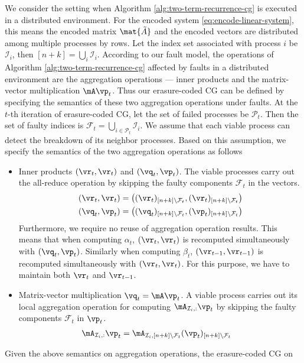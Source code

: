 \documentclass[11pt]{article}
\newcommand{\tA}{\mat{\tilde{A}}}
\newcommand{\sF}{{\mathcal{F}}}
\newcommand{\sI}{{\mathcal{I}}}
\newcommand{\sP}{{\mathcal{P}}}
\begin{document}
We consider the setting when Algorithm \ref{alg:two-term-recurrence-cg} is executed
in a distributed environment. For the encoded system \eqref{eq:encode-linear-system},
this means the encoded matrix $\tA$ and the encoded vectors are distributed among
multiple processes by rows. Let the index set associated with process $i$ be $\sI_i$,
then $[n+k]=\bigcup_{i}\sI_i$. According to our fault model, the operations of
Algorithm \ref{alg:two-term-recurrence-cg} affected by faults in a distributed
environment are the aggregation operations --- inner products and the matrix-vector
multiplication $\mA\vp_t$. Thus our erasure-coded CG can be defined by specifying
the semantics of these two aggregation operations under faults. At the $t$-th
iteration of erasure-coded CG, let the set of failed processes be $\sP_t$.
Then the set of faulty indices is $\sF_t=\bigcup_{i\in\sP_t}\sI_i$. We assume that 
each viable process can detect the breakdown of its neighbor processes. 
Based on this assumption, we specify the semantics of the two aggregation operations as follows
\begin{itemize}
\item Inner products $(\vr_t,\vr_t)$ and $(\vq_t,\vp_t)$. The viable processes carry out the all-reduce operation by skipping the faulty components $\sF_t$ in the vectors.
\begin{align}
(\vr_t,\vr_t) &= \left((\vr_t)_{[n+k]\backslash \sF_t},(\vr_t)_{[n+k]\backslash \sF_t}\right)
\label{eq:inner-product-fault-tolerant}
\\
(\vq_t,\vp_t) &= \left((\vq_t)_{[n+k]\backslash \sF_t},(\vp_t)_{[n+k]\backslash \sF_t}\right)
\nonumber
\end{align}
Furthermore, we require no reuse of aggregation operation results. This means that
when computing $\alpha_t$, $(\vr_t,\vr_t)$ is recomputed simultaneously
with $(\vq_t,\vp_t)$. Similarly when computing $\beta_t$, $(\vr_{t-1}, \vr_{t-1})$
is recomputed simultaneously with $(\vr_t,\vr_t)$. For this purpose, we have to
maintain both $\vr_t$ and $\vr_{t-1}$.
\item Matrix-vector multiplication $\vq_t=\mA \vp_t$. A viable process carries out its local aggregation operation for computing  $\mA_{\sI_i,:} \vp_t$ by skipping the faulty components $\sF_t$ in $\vp_t$.
\begin{align*}
\mA_{\sI_i,:}\vp_t &= \mA_{\sI_i,[n+k]\backslash \sF_t}(\vp_t)_{[n+k]\backslash \sF_t}
\end{align*}
\end{itemize}
Given the above semantics on aggregation operations, the erasure-coded CG on
\end{document}
